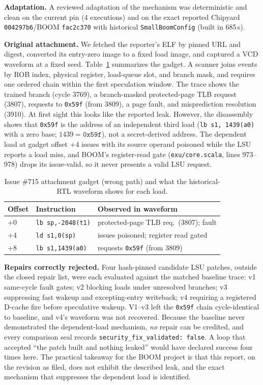 \documentclass[conference,10pt]{IEEEtran}
\begin{document}
\textbf{Adaptation.} A reviewed adaptation of the mechanism was deterministic and
clean on the current pin (4 executions) and on the exact reported
Chipyard \texttt{004297b6}/BOOM \texttt{fac2c370} with historical
\texttt{SmallBoomConfig} (built in 685\,s).

\textbf{Original attachment.} We fetched the reporter's ELF by pinned URL and
digest, converted its entry-zero image to a fixed load image, and captured a
VCD waveform at a fixed seed. Table~\ref{tab:gadget} summarizes the gadget. A scanner joins events by ROB index,
physical register, load-queue slot, and branch mask, and requires one ordered
chain within the first speculation window. The trace shows the trained branch
(cycle 3769), a branch-masked protected-page TLB request (3807), requests to
\texttt{0x59f} (from 3809), a page fault, and misprediction resolution (3910).
At first sight this looks like the reported leak. However, the disassembly shows that
\texttt{0x59f} is the address of an independent third load
(\texttt{lb s1, 1439(a0)} with a zero base; $1439 = \texttt{0x59f}$), not a
secret-derived address. The dependent load at gadget offset +4 issues with its source operand
poisoned while the LSU reports a load miss, and BOOM's register-read gate
(\texttt{exu/core.scala}, lines 973--978) drops its issue-valid, so it never
presents a valid LSU request.

\begin{table}[t]
\centering
\caption{Issue \#715 attachment gadget (wrong path) and what the
historical-RTL waveform shows for each load.}
\label{tab:gadget}
\footnotesize
\setlength{\tabcolsep}{3pt}
\begin{tabular}{@{}lll@{}}
\toprule
Offset & Instruction & Observed in waveform \\
\midrule
+0 & \texttt{lb sp,-2048(t1)} & protected-page TLB req.\ (3807); fault \\
+4 & \texttt{ld s1,0(sp)} & issues poisoned; register read gated \\
+8 & \texttt{lb s1,1439(a0)} & requests \texttt{0x59f} (from 3809) \\
\bottomrule
\end{tabular}
\end{table}

\textbf{Repairs correctly rejected.} Four hash-pinned candidate LSU patches,
outside the closed repair list, were each evaluated against the matched baseline
trace: v1 same-cycle fault gates; v2 blocking loads under unresolved branches; v3 suppressing fast wakeup and
excepting-entry writeback; v4 requiring a registered D-cache fire before
speculative wakeup. V1--v3 left the \texttt{0x59f} chain cycle-identical to
baseline, and v4's waveform was not recovered. Because the baseline never
demonstrated the dependent-load mechanism, \emph{no} repair can be credited, and
every comparison seal records \texttt{security\_fix\_validated: false}. A loop
that accepted ``the patch built and nothing leaked'' would have declared success
four times here. The practical takeaway for the BOOM project is that this report,
on the revision as filed, does not exhibit the described leak, and the exact
mechanism that suppresses the dependent load is identified.
\end{document}
